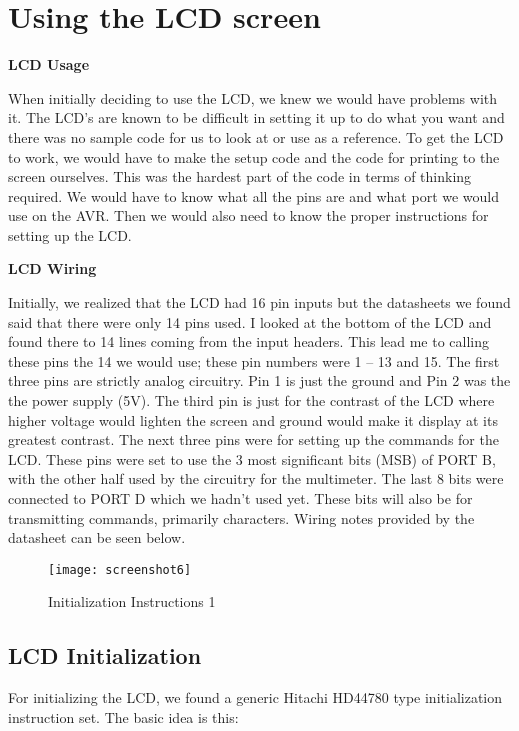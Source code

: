 \section{Using the LCD screen}


\textbf{LCD Usage}

When initially deciding to use the LCD, we knew we would have problems with it.  The LCD's are known to be difficult in setting it up to do what you want and there was no sample code for us to look at or use as a reference. To get the LCD to work, we would have to make the setup code and the code for printing to the screen ourselves. This was the hardest part of the code  in terms of thinking required. We would have to know what all the pins are and what port we would use on the AVR. Then we would also need to know the proper instructions for setting up the LCD.

\textbf{LCD Wiring}

Initially, we realized that the LCD had 16 pin inputs but the datasheets we found said that there were only 14 pins used. I looked at the bottom of the LCD and found there to 14  lines coming from the input headers. This lead me to calling these pins the 14 we would use; these pin numbers were 1 – 13 and 15. The first three pins are strictly analog circuitry. Pin  1 is just the ground and Pin  2 was the  the power supply (5V). The third pin is just for the contrast of the LCD where higher voltage would lighten the screen and ground would make it display at its greatest contrast. The next three pins were for setting up the commands for the LCD. These pins were set to use the 3 most significant bits (MSB) of PORT B, with the other half used by the circuitry for the multimeter. The last 8 bits were connected to PORT D which we hadn't used yet. These bits will also be for transmitting commands, primarily characters. 
	Wiring notes provided by the datasheet can be seen below.

\begin{figure}[h]
\centering
\texttt{[image: screenshot6]}
\caption{Initialization Instructions 1}
\label{SECTION:fig:IFC}
\end{figure}

\subsection{LCD Initialization}
For initializing the LCD, we found a generic Hitachi HD44780 type initialization instruction set. The basic idea is this:

